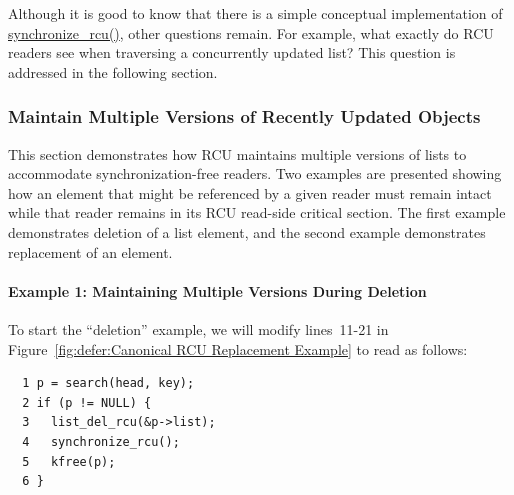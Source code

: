 Although it is good to know that there is a simple conceptual
implementation of \url{synchronize_rcu()}, other questions remain.
For example, what exactly do RCU
readers see when traversing a concurrently updated list?
This question is addressed in the following section.

\subsubsection{Maintain Multiple Versions of Recently Updated Objects}
\label{sec:defer:Maintain Multiple Versions of Recently Updated Objects}

This section demonstrates how RCU maintains multiple versions of
lists to accommodate synchronization-free readers.
Two examples are presented showing how an element
that might be referenced by a given reader must remain intact
while that reader remains in its RCU read-side critical section.
The first example demonstrates deletion of a list element,
and the second example demonstrates replacement of an element.

\paragraph{Example 1: Maintaining Multiple Versions During Deletion}
\label{sec:defer:Example 1: Maintaining Multiple Versions During Deletion}

To start the ``deletion'' example,
we will modify lines~11-21 in
Figure~\ref{fig:defer:Canonical RCU Replacement Example}
to read as follows:

\vspace{5pt}
\begin{minipage}[t]{\columnwidth}
\begin{verbatim}
  1 p = search(head, key);
  2 if (p != NULL) {
  3   list_del_rcu(&p->list);
  4   synchronize_rcu();
  5   kfree(p);
  6 }
\end{verbatim}
\end{minipage}
\vspace{5pt}

